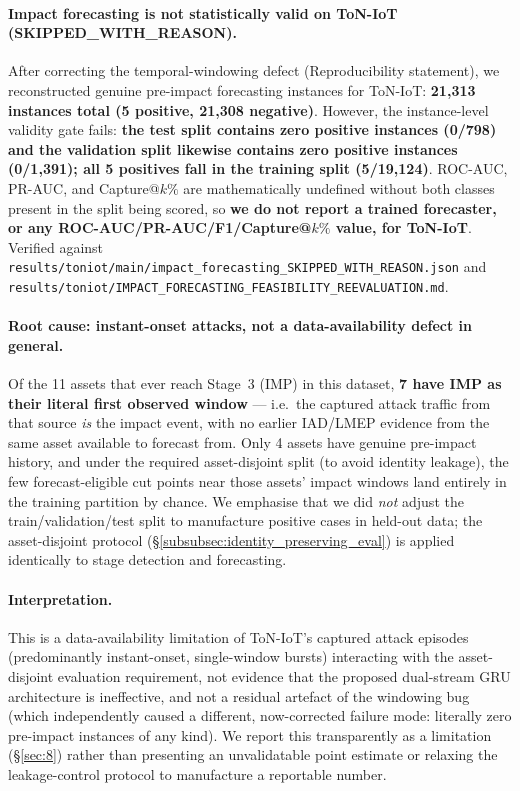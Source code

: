 \documentclass[pdflatex,sn-mathphys-num]{sn-jnl}
\theoremstyle{thmstyleone}%
\theoremstyle{thmstyletwo}%
\theoremstyle{thmstylethree}%
\begin{document}
\paragraph{Impact forecasting is not statistically valid on ToN-IoT (SKIPPED\_WITH\_REASON).}
After correcting the temporal-windowing defect (Reproducibility statement), we reconstructed genuine pre-impact forecasting instances for ToN-IoT: \textbf{21{,}313 instances total (5 positive, 21{,}308 negative)}. However, the instance-level validity gate fails: \textbf{the test split contains zero positive instances (0/798) and the validation split likewise contains zero positive instances (0/1{,}391); all 5 positives fall in the training split (5/19{,}124)}. ROC-AUC, PR-AUC, and Capture@$k\%$ are mathematically undefined without both classes present in the split being scored, so \textbf{we do not report a trained forecaster, or any ROC-AUC/PR-AUC/F1/Capture@$k\%$ value, for ToN-IoT}. Verified against \texttt{results/toniot/main/impact\_forecasting\_SKIPPED\_WITH\_REASON.json} and \texttt{results/toniot/IMPACT\_FORECASTING\_FEASIBILITY\_REEVALUATION.md}.

\paragraph{Root cause: instant-onset attacks, not a data-availability defect in general.}
Of the 11 assets that ever reach Stage~3 (IMP) in this dataset, \textbf{7 have IMP as their literal first observed window} --- i.e.\ the captured attack traffic from that source \emph{is} the impact event, with no earlier IAD/LMEP evidence from the same asset available to forecast from. Only 4 assets have genuine pre-impact history, and under the required asset-disjoint split (to avoid identity leakage), the few forecast-eligible cut points near those assets' impact windows land entirely in the training partition by chance. We emphasise that we did \emph{not} adjust the train/validation/test split to manufacture positive cases in held-out data; the asset-disjoint protocol (\S\ref{subsubsec:identity_preserving_eval}) is applied identically to stage detection and forecasting.

\paragraph{Interpretation.}
This is a data-availability limitation of ToN-IoT's captured attack episodes (predominantly instant-onset, single-window bursts) interacting with the asset-disjoint evaluation requirement, not evidence that the proposed dual-stream GRU architecture is ineffective, and not a residual artefact of the windowing bug (which independently caused a different, now-corrected failure mode: literally zero pre-impact instances of any kind). We report this transparently as a limitation (\S\ref{sec:8}) rather than presenting an unvalidatable point estimate or relaxing the leakage-control protocol to manufacture a reportable number.
\end{document}
